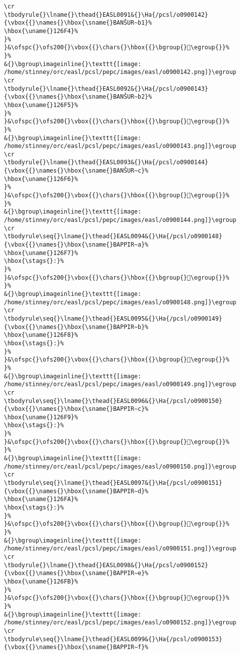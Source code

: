 \begin{verbatim}
\cr
\tbodyrule{}\lname{}\thead{}EASL0091&{}\Ha{/pcsl/o0900142}{\vbox{{}\names{}\hbox{\sname{}BANŠUR∼b1}%
\hbox{\uname{}126F4}%
}%
}&\ofspc{}\ofs200{}\vbox{{}\chars{}\hbox{{}\bgroup{}𒛴\egroup{}}%
}%
&{}\bgroup\imageinline{}\texttt{[image: /home/stinney/orc/easl/pcsl/pepc/images/easl/o0900142.png]}\egroup
\cr
\tbodyrule{}\lname{}\thead{}EASL0092&{}\Ha{/pcsl/o0900143}{\vbox{{}\names{}\hbox{\sname{}BANŠUR∼b2}%
\hbox{\uname{}126F5}%
}%
}&\ofspc{}\ofs200{}\vbox{{}\chars{}\hbox{{}\bgroup{}𒛵\egroup{}}%
}%
&{}\bgroup\imageinline{}\texttt{[image: /home/stinney/orc/easl/pcsl/pepc/images/easl/o0900143.png]}\egroup
\cr
\tbodyrule{}\lname{}\thead{}EASL0093&{}\Ha{/pcsl/o0900144}{\vbox{{}\names{}\hbox{\sname{}BANŠUR∼c}%
\hbox{\uname{}126F6}%
}%
}&\ofspc{}\ofs200{}\vbox{{}\chars{}\hbox{{}\bgroup{}𒛶\egroup{}}%
}%
&{}\bgroup\imageinline{}\texttt{[image: /home/stinney/orc/easl/pcsl/pepc/images/easl/o0900144.png]}\egroup
\cr
\tbodyrule\seq{}\lname{}\thead{}EASL0094&{}\Ha{/pcsl/o0900148}{\vbox{{}\names{}\hbox{\sname{}BAPPIR∼a}%
\hbox{\uname{}126F7}%
\hbox{\stags{}:}%
}%
}&\ofspc{}\ofs200{}\vbox{{}\chars{}\hbox{{}\bgroup{}𒛷\egroup{}}%
}%
&{}\bgroup\imageinline{}\texttt{[image: /home/stinney/orc/easl/pcsl/pepc/images/easl/o0900148.png]}\egroup
\cr
\tbodyrule\seq{}\lname{}\thead{}EASL0095&{}\Ha{/pcsl/o0900149}{\vbox{{}\names{}\hbox{\sname{}BAPPIR∼b}%
\hbox{\uname{}126F8}%
\hbox{\stags{}:}%
}%
}&\ofspc{}\ofs200{}\vbox{{}\chars{}\hbox{{}\bgroup{}𒛸\egroup{}}%
}%
&{}\bgroup\imageinline{}\texttt{[image: /home/stinney/orc/easl/pcsl/pepc/images/easl/o0900149.png]}\egroup
\cr
\tbodyrule\seq{}\lname{}\thead{}EASL0096&{}\Ha{/pcsl/o0900150}{\vbox{{}\names{}\hbox{\sname{}BAPPIR∼c}%
\hbox{\uname{}126F9}%
\hbox{\stags{}:}%
}%
}&\ofspc{}\ofs200{}\vbox{{}\chars{}\hbox{{}\bgroup{}𒛹\egroup{}}%
}%
&{}\bgroup\imageinline{}\texttt{[image: /home/stinney/orc/easl/pcsl/pepc/images/easl/o0900150.png]}\egroup
\cr
\tbodyrule\seq{}\lname{}\thead{}EASL0097&{}\Ha{/pcsl/o0900151}{\vbox{{}\names{}\hbox{\sname{}BAPPIR∼d}%
\hbox{\uname{}126FA}%
\hbox{\stags{}:}%
}%
}&\ofspc{}\ofs200{}\vbox{{}\chars{}\hbox{{}\bgroup{}𒛺\egroup{}}%
}%
&{}\bgroup\imageinline{}\texttt{[image: /home/stinney/orc/easl/pcsl/pepc/images/easl/o0900151.png]}\egroup
\cr
\tbodyrule{}\lname{}\thead{}EASL0098&{}\Ha{/pcsl/o0900152}{\vbox{{}\names{}\hbox{\sname{}BAPPIR∼e}%
\hbox{\uname{}126FB}%
}%
}&\ofspc{}\ofs200{}\vbox{{}\chars{}\hbox{{}\bgroup{}𒛻\egroup{}}%
}%
&{}\bgroup\imageinline{}\texttt{[image: /home/stinney/orc/easl/pcsl/pepc/images/easl/o0900152.png]}\egroup
\cr
\tbodyrule\seq{}\lname{}\thead{}EASL0099&{}\Ha{/pcsl/o0900153}{\vbox{{}\names{}\hbox{\sname{}BAPPIR∼f}%

\end{verbatim}
